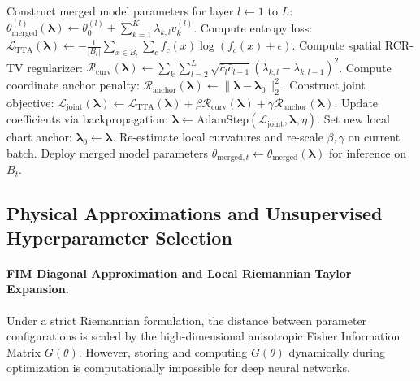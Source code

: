 \begin{algorithm}[tb]
\begin{algorithmic}[1]
    \STATE Construct merged model parameters for layer $l \gets 1$ to $L$: \\
    $\theta_{\text{merged}}^{(l)}(\boldsymbol{\lambda}) \gets \theta_0^{(l)} + \sum_{k=1}^K \lambda_{k, l} v_k^{(l)}$.
    \STATE Compute entropy loss: $\mathcal{L}_{\text{TTA}}(\boldsymbol{\lambda}) \gets -\frac{1}{|B_t|} \sum_{x \in B_t} \sum_{c} f_c(x) \log(f_c(x) + \epsilon)$.
    \STATE Compute spatial RCR-TV regularizer: $\mathcal{R}_{\text{curv}}(\boldsymbol{\lambda}) \gets \sum_k \sum_{l=2}^L \sqrt{\bar{c}_l \bar{c}_{l-1}} (\lambda_{k, l} - \lambda_{k, l-1})^2$.
    \STATE Compute coordinate anchor penalty: $\mathcal{R}_{\text{anchor}}(\boldsymbol{\lambda}) \gets \|\boldsymbol{\lambda} - \boldsymbol{\lambda}_0\|_2^2$.
    \STATE Construct joint objective: $\mathcal{L}_{\text{joint}}(\boldsymbol{\lambda}) \gets \mathcal{L}_{\text{TTA}}(\boldsymbol{\lambda}) + \beta \mathcal{R}_{\text{curv}}(\boldsymbol{\lambda}) + \gamma \mathcal{R}_{\text{anchor}}(\boldsymbol{\lambda})$.
    \STATE Update coefficients via backpropagation: $\boldsymbol{\lambda} \gets \text{AdamStep}(\mathcal{L}_{\text{joint}}, \boldsymbol{\lambda}, \eta)$.
        \STATE Set new local chart anchor: $\boldsymbol{\lambda}_0 \gets \boldsymbol{\lambda}$.
        \STATE Re-estimate local curvatures and re-scale $\beta, \gamma$ on current batch.
    \ENDIF
    \STATE Deploy merged model parameters $\theta_{\text{merged}, t} \gets \theta_{\text{merged}}(\boldsymbol{\lambda})$ for inference on $B_t$.
\ENDFOR
\end{algorithmic}
\end{algorithm}

\subsection{Physical Approximations and Unsupervised Hyperparameter Selection}

\paragraph{FIM Diagonal Approximation and Local Riemannian Taylor Expansion.}
Under a strict Riemannian formulation, the distance between parameter configurations is scaled by the high-dimensional anisotropic Fisher Information Matrix $G(\theta)$. However, storing and computing $G(\theta)$ dynamically during optimization is computationally impossible for deep neural networks. 

